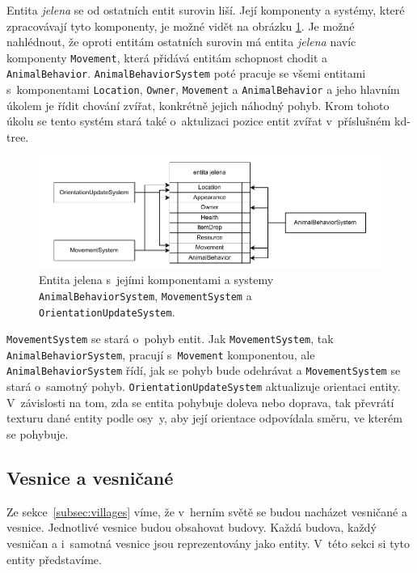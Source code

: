 Entita \textit{jelena} se od ostatních entit surovin liší. Její komponenty a systémy, které zpracovávají tyto komponenty, je možné vidět na obrázku \ref{fig:deer}. Je možné nahlédnout, že oproti entitám ostatních surovin má entita \textit{jelena} navíc komponenty \texttt{Movement}, která přidává entitám schopnost chodit a \texttt{AnimalBehavior}. \texttt{AnimalBehaviorSystem} poté pracuje se všemi entitami s~komponentami \texttt{Location}, \texttt{Owner}, \texttt{Movement} a \texttt{AnimalBehavior} a jeho hlavním úkolem je řídit chování zvířat, konkrétně jejich náhodný pohyb. Krom tohoto úkolu se tento systém stará také o~aktulizaci pozice entit zvířat v~příslušném kd-tree.

\begin{figure}[!htb]
  \centering
  \includegraphics[width=1.0\linewidth]{img/deer.pdf}
  \caption{Entita jelena s~jejími komponentami a systemy \texttt{AnimalBehaviorSystem}, \texttt{MovementSystem} a \texttt{OrientationUpdateSystem}.}
  \label{fig:deer}
\end{figure}

\texttt{MovementSystem} se stará o~pohyb entit. Jak \texttt{MovementSystem}, tak \texttt{AnimalBehaviorSystem}, pracují s~\texttt{Movement} komponentou, ale \texttt{AnimalBehaviorSystem} řídí, jak se pohyb bude odehrávat a \texttt{MovementSystem} se stará o~samotný pohyb. \texttt{OrientationUpdateSystem} aktualizuje orientaci entity. V~závislosti na tom, zda se entita pohybuje doleva nebo doprava, tak převrátí texturu dané entity podle osy~y, aby její orientace odpovídala směru, ve kterém se pohybuje.

\subsection{Vesnice a vesničané}
Ze sekce~\ref{subsec:villages} víme, že v~herním světě se budou nacházet vesničané a vesnice. Jednotlivé vesnice budou obsahovat budovy. Každá budova, každý vesničan a i~samotná vesnice jsou reprezentovány jako entity. V~této sekci si tyto entity představíme.

